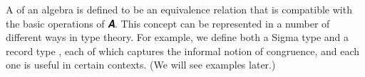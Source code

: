A  of an algebra  is defined to be an equivalence relation that is compatible with the basic operations of \ab 𝑨. This concept can be represented in a number of different ways in type
theory. For example, we define both a Sigma type  and a record type , each of which captures the informal notion of congruence, and each one is useful in certain contexts. (We will see examples later.)
\ccpad
\begin{code}%
\>[0]\AgdaSpace{}%
\AgdaSymbol{:}\AgdaSpace{}%
\AgdaSymbol{\{}\AgdaSpace{}%
\AgdaSymbol{:}\AgdaSpace{}%
\AgdaSymbol{\}(}\AgdaSpace{}%
\AgdaSymbol{:}\AgdaSpace{}%
\AgdaSpace{}%
\AgdaSpace{}%
\AgdaSymbol{)}\AgdaSpace{}%
\AgdaSpace{}%
\AgdaSpace{}%
\AgdaSpace{}%
\<%
\\
\>[0]\AgdaSpace{}%
\AgdaSymbol{\{}\AgdaSymbol{\}}\AgdaSpace{}%
\AgdaSpace{}%
\AgdaSymbol{=}\AgdaSpace{}%
\AgdaSpace{}%
\AgdaSpace{}%
\AgdaSpace{}%
\AgdaSymbol{(}\AgdaSpace{}%
\AgdaSpace{}%
\AgdaSpace{}%
\AgdaSpace{}%
\AgdaSpace{}%
\AgdaSpace{}%
\AgdaSymbol{)}\AgdaSpace{}%
\AgdaFunction{,}\AgdaSpace{}%
\AgdaSpace{}%
\AgdaSpace{}%
\AgdaSpace{}%
\AgdaSpace{}%
\AgdaSpace{}%
\<%
\\
%
\\[\AgdaEmptyExtraSkip]%
\>[0]\AgdaSpace{}%
\AgdaSpace{}%
\AgdaSymbol{\{}\AgdaSpace{}%
\AgdaSpace{}%
\AgdaSymbol{:}\AgdaSpace{}%
\AgdaSymbol{\}}\AgdaSpace{}%
\AgdaSymbol{(}\AgdaSpace{}%
\AgdaSymbol{:}\AgdaSpace{}%
\AgdaSpace{}%
\AgdaSpace{}%
\AgdaSymbol{)}\AgdaSpace{}%
\AgdaSymbol{:}\AgdaSpace{}%
\AgdaSpace{}%
\AgdaSpace{}%
\AgdaSpace{}%
\AgdaSpace{}%
%
\>[67]\<%
\\
\>[0][@{}l@{\AgdaIndent{0}}]%
\>[1]\AgdaSpace{}%
\<%
\\

\end{code}
